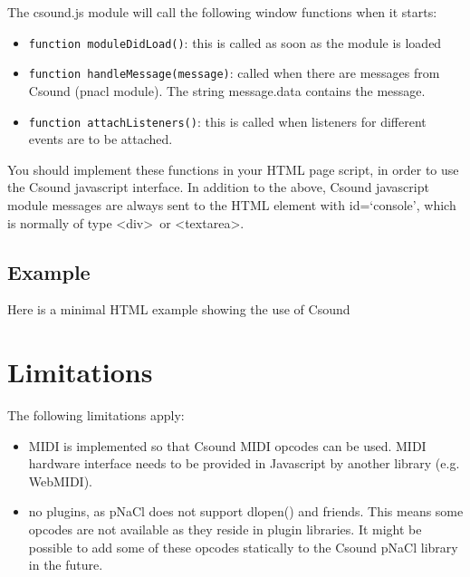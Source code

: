 \documentclass[11pt]{article}
\begin{document}
The csound.js module will call the following window functions when it starts:

\begin{itemize} 
\item {\tt function moduleDidLoad()}: this is called as soon as the module is loaded 
\item {\tt function handleMessage(message)}: called when there are messages from Csound (pnacl module). 
The string message.data contains the message.
\item {\tt function attachListeners()}: this is called when listeners for different events are to be attached. 
\end{itemize}

You should implement these functions in your HTML page script, in order to use the Csound javascript interface.
In addition to the above, Csound javascript module messages are always sent to the HTML element with id=`console', 
which is normally of type \textless div\textgreater \, or \textless textarea\textgreater .

\subsection{Example}

Here is a minimal HTML example showing the use of Csound



\section{Limitations}

The following limitations apply:

\begin{itemize}
\item MIDI is implemented so that Csound MIDI opcodes can be used. MIDI hardware interface needs to be provided
in Javascript by another library (e.g. WebMIDI).
\item no plugins, as pNaCl does not support dlopen() and friends. This means some opcodes are not available as they reside in plugin libraries.
It might be possible to add some of these opcodes statically to the Csound pNaCl library in the future.
\end {itemize}
\end{document}
